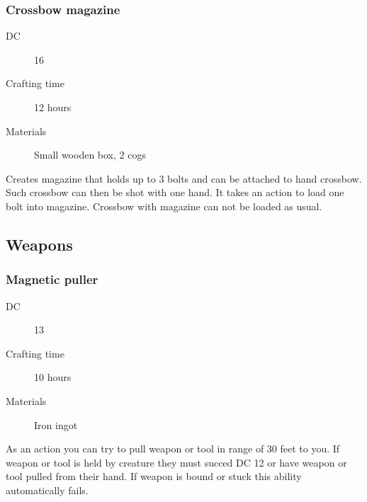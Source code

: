 \subsubsection{Crossbow magazine}

\begin{description}
\item [DC] 16 \sleightofhands
\item [Crafting time] 12 hours
\item [Materials] Small wooden box, 2 cogs
\end{description}

Creates magazine that holds up to 3 bolts and can be attached to hand crossbow. Such crossbow can then be shot with one hand. It takes an action to load one bolt into magazine. Crossbow with magazine can not be loaded as usual.

\subsection{Weapons}

\subsubsection{Magnetic puller}

\begin{description}
\item [DC] 13 \nature
\item [Crafting time] 10 hours
\item [Materials] Iron ingot
\end{description}

As an action you can try to pull weapon or tool in range of 30 feet to you. If weapon or tool is held by creature they must succed DC 12 \strengthsave or have weapon or tool pulled from their hand. If weapon is bound or stuck this ability automatically fails.